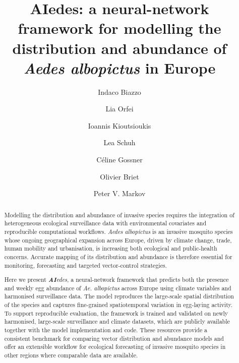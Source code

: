 \documentclass[preprint,12pt]{elsarticle}
\date{}
\begin{document}
\begin{frontmatter}

\title{AIedes: a neural-network framework for modelling the distribution and abundance of \textit{Aedes albopictus} in Europe}

\author[jrc]{Indaco Biazzo}

\author[jrc]{Lia Orfei}

\author[patras]{Ioannis Kioutsioukis}

\author[jrc]{Lea Schuh}

\author[ecdc]{Céline Gossner}

\author[ecdc]{Olivier Briet}

\author[jrc,lshtm]{Peter V. Markov}






\begin{abstract}
Modelling the distribution and abundance of invasive species requires the
integration of heterogeneous ecological surveillance data with environmental
covariates and reproducible computational workflows. \emph{Aedes albopictus}
is an invasive mosquito species whose ongoing geographical expansion across
Europe, driven by climate change, trade, human mobility and urbanisation, is
increasing both ecological and public-health concerns. Accurate mapping of its
distribution and abundance is therefore essential for monitoring, forecasting
and targeted vector-control strategies.

Here we present \textit{\textbf{AI}edes}, a neural-network framework that
predicts both the presence and weekly egg abundance of \emph{Ae. albopictus}
across Europe using climate variables and harmonised surveillance data. The
model reproduces the large-scale spatial distribution of the species and
captures fine-grained spatiotemporal variation in egg-laying activity. To
support reproducible evaluation, the framework is trained and validated on
newly harmonised, large-scale surveillance and climate datasets, which are
publicly available together with the model implementation and code. These
resources provide a consistent benchmark for comparing vector distribution
and abundance models and offer an extensible workflow for ecological
forecasting of invasive mosquito species in other regions where comparable
data are available.
\end{abstract}


\end{frontmatter}
\end{document}
